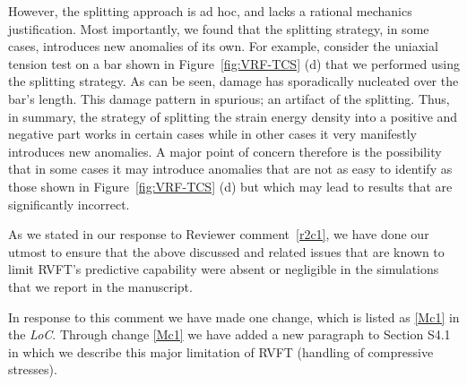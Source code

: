 \documentclass[11pt,letterpaper]{report}
\begin{document}
\begin{enumerate}[label=\textit{2.\arabic*},wide, labelwidth=!, labelindent=0pt]
However, the splitting approach is ad hoc, and lacks a rational mechanics justification.
%
Most importantly, we found that the splitting strategy, in some cases, introduces new anomalies of its own.
%
For example, consider the uniaxial tension test on a bar shown in Figure~\ref{fig:VRF-TCS} (d) that we performed using the splitting strategy.
%
As can be seen, damage has sporadically nucleated over the bar's length. This damage pattern in spurious;  an artifact of the splitting.
%
Thus, in summary, the strategy of splitting the strain energy density into a positive and negative part works in certain cases while in other cases it very manifestly introduces new anomalies.
%
A major point of concern therefore is the possibility that in some cases it  may introduce anomalies that are not as easy to identify as those shown in Figure~\ref{fig:VRF-TCS} (d) but which may lead to results that are significantly incorrect.

As we stated in our response to Reviewer comment~\ref{r2c1}, we have done our utmost to ensure that the above discussed and related issues that are known to limit RVFT's predictive capability were absent or negligible in the  simulations that we report in the manuscript.

In response to this comment we have made one change, which is listed as \ref{Mc1} in the \textit{LoC}.
%
Through change \ref{Mc1} we have added a new paragraph to Section S4.1 in which we describe this major limitation of RVFT (handling of compressive stresses).





\end{enumerate}
\end{document}
